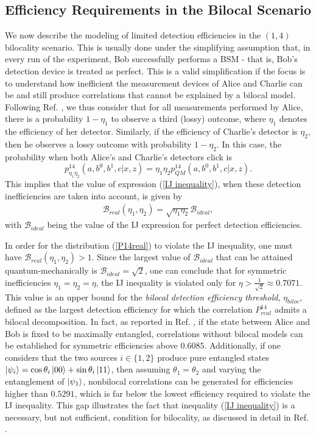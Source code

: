 \documentclass[aps,pra,reprint, superscriptaddress,showkeys]{revtex4-2}
\theoremstyle{plain}
\begin{document}
\subsection{Efficiency Requirements in the Bilocal Scenario}
We now describe the modeling of limited detection efficiencies in the $(1,4)$ bilocality scenario. This is usually done under the simplifying assumption that, in every run of the experiment, Bob successfully performs a BSM - that is, Bob's detection device is treated as perfect. This is a valid simplification if the focus is to understand how inefficient the measurement devices of Alice and Charlie can be and still produce correlations that cannot be explained by a bilocal model. Following Ref. \cite{boundingthesets}, we thus consider that for all measurements performed by Alice, there is a probability $1-\eta_1$ to observe a third (lossy) outcome, where $\eta_1$ denotes the efficiency of her detector. Similarly, if the efficiency of Charlie's detector is $\eta_2$, then he observes a lossy outcome with probability $1-\eta_2$. In this case, the probability when both Alice's and Charlie's detectors click is 
\begin{equation}
    p_{\eta_1 \eta_2}^{14}(a,b^0,b^1,c|x,z) = \eta_1\eta_2 p_{QM}^{14}(a,b^0,b^1,c|x,z).
    \label{P14real}
\end{equation}
This implies that the value of expression (\ref{IJ inequality}), when these detection inefficiencies are taken into account, is given by
\begin{eqnarray}
    \mathcal{B}_{real}(\eta_1,\eta_2) = \sqrt{\eta_1\eta_2}\mathcal{B}_{ideal},
\end{eqnarray}
with $\mathcal{B}_{ideal}$ being the value of the IJ expression for perfect detection efficiencies. 

In order for the distribution (\ref{P14real}) to violate the IJ inequality, one must have $ \mathcal{B}_{real}(\eta_1,\eta_2)>1$. Since the largest value of $\mathcal{B}_{ideal}$ that can be attained quantum-mechanically is $\mathcal{B}_{ideal}=\sqrt{2}$, one can conclude that for symmetric inefficiencies $\eta_1=\eta_2=\eta$, the  IJ inequality is violated only for $ \eta>\frac{1}{\sqrt{2}} \approx 0.7071$. This value is an upper bound for the \textit{bilocal detection efficiency threshold}, $\eta_{biloc}$, defined as the largest detection efficiency for which the correlation $P^{14}_{real}$ admits a
bilocal decomposition. In fact, as reported in Ref. \cite{boundingthesets}, if the state between Alice and Bob is fixed to be maximally entangled, correlations
without bilocal models can be established for symmetric efficiencies
above $0.6085$. Additionally, if one considers that the two sources $i\in\{1,2\}$ produce pure entangled states $\ket{\psi_i}=\cos\theta_i\ket{00}+\sin\theta_i\ket{11}$, then assuming $\theta_1=\theta_2$ and varying the entanglement of $\ket{\psi_1}$, nonbilocal correlations can be generated for efficiencies higher than $0.5291$, which is far below the lowest efficiency required to violate the IJ inequality. This gap illustrates the fact that inequality (\ref{IJ inequality}) is a necessary, but not sufficient, condition for bilocality, as discussed in detail in Ref. \cite{polynomialBell}.
\end{document}
